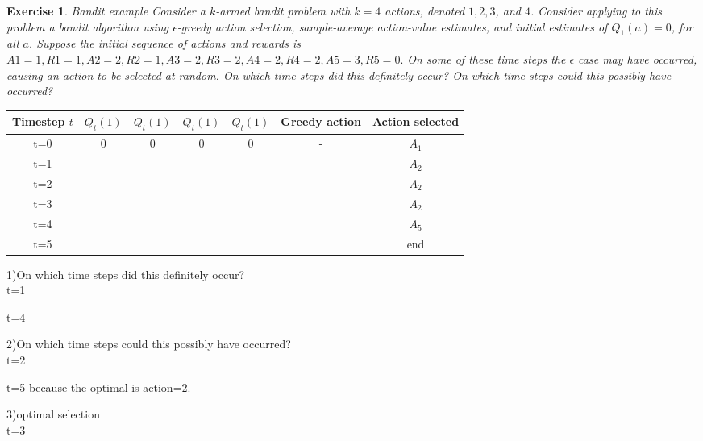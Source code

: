 \documentclass[answers]{exam}
\newtheorem{exercise}[theorem]{Exercise}
\theoremstyle{definition}
\theoremstyle{remark}
\newcommand{\e}{\epsilon}
\begin{document}
\begin{exercise}
Bandit example Consider a $k$-armed bandit problem with $k = 4$ actions, denoted $1, 2, 3$, and $4$. Consider applying to this problem a bandit algorithm using $\e$-greedy action selection, sample-average action-value estimates, and initial estimates of $Q_1(a) = 0$, for all $a$. Suppose the initial sequence of actions and rewards is $A1 = 1, R1 = 1, A2 = 2, R2 = 1, A3 = 2, R3 = 2, A4 = 2, R4 = 2, A5 = 3, R5 = 0.$ On some of these time steps the $\e$ case may have occurred, causing an action to be selected at random. On which time steps did this definitely occur? On which time steps could this possibly have occurred?
\end{exercise}
\begin{solution}

\begin{tabularx}{\linewidth}{ccccccc}
Timestep $t$ & $Q_{t}(1)$ & $Q_{t}(1)$    & $Q_{t}(1)$  & $Q_{t}(1)$ & Greedy action & Action selected\\
\hline 
t=0&0&0&0&0&-&$A_{1}$\\
\hline 
t=1&&&&&&$A_{2}$\\
\hline 
t=2&&&&&&$A_{2}$\\
\hline 
t=3&&&&&&$A_{2}$\\
\hline 
t=4&&&&&&$A_{5}$\\
\hline 
t=5&&&&&&end\\
\end{tabularx}


\end{solution}


1)On which time steps did this definitely occur?\\
t=1 

t=4


2)On which time steps could this possibly have occurred?\\
t=2

t=5
because the optimal is action=2.

3)optimal selection\\

t=3 
\end{document}
